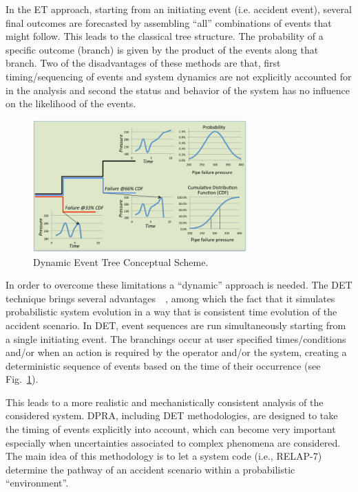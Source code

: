 \label{sec:det}
In the ET approach, starting from an initiating event (i.e. accident event), several final outcomes are forecasted by assembling ``all'' combinations of events that might follow. This leads to the classical tree structure. The probability of a specific outcome (branch) is given by the product of the events along that branch.
Two of the disadvantages of these methods are that, first timing/sequencing of events and system dynamics are not explicitly accounted for in the analysis and second the status and behavior of the system has no influence on the likelihood of the events.
\begin{figure}[h]
  \centering
     \includegraphics[width=0.73\textwidth]{figures/DET_schemeFlow.png}
  \caption{Dynamic Event Tree Conceptual Scheme.}
   \label{fig:DET_schemeFlow}
\end{figure}
In order to overcome these limitations a ``dynamic'' approach is needed. The DET technique brings several advantages~\cite{alfonsiPSA}~\cite{ADAPTHakobyan}, among which the fact that it simulates probabilistic system evolution in a way that is consistent time evolution of the accident scenario. In DET,  event sequences are run simultaneously starting from a single initiating event. The branchings occur at user specified times/conditions and/or when an action is required by the operator and/or the system, creating a deterministic sequence of events based on the time of their occurrence (see Fig.~\ref{fig:DET_schemeFlow}).

This leads to a more realistic and mechanistically consistent analysis of the considered system. DPRA, including  DET methodologies,  are designed to take the timing of events explicitly into account, which can become very important especially when uncertainties associated to complex phenomena are considered. \\
The main idea of this methodology is to let a system code (i.e., RELAP-7) determine the pathway of an accident scenario within a probabilistic ``environment''.

